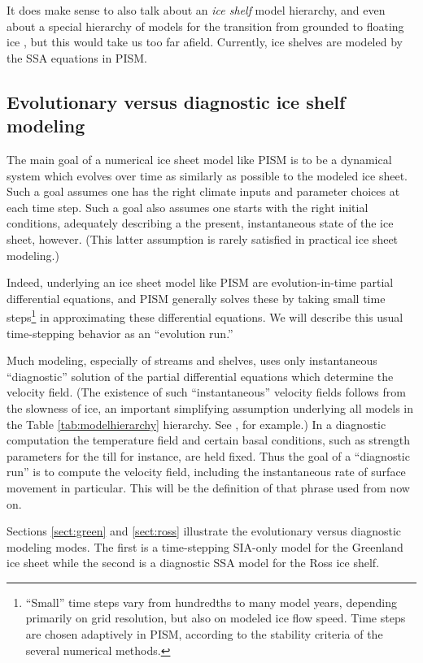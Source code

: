 \documentclass[11pt,final]{amsart}
\begin{document}
It does make sense to also talk about an \emph{ice shelf} model hierarchy, and even about a special hierarchy of models for the transition from grounded to floating ice \cite{SchoofMarine1}, but this would take us too far afield.  Currently, ice shelves are modeled by the SSA equations in PISM.


\subsection{Evolutionary versus diagnostic ice shelf modeling} \label{subsect:basicmodes}    The main goal of a numerical ice sheet model like PISM is to be a dynamical system which evolves over time as similarly as possible to the modeled ice sheet.  Such a goal assumes one has the right climate inputs and parameter choices at each time step.  Such a goal also assumes one starts with the right initial conditions, adequately describing a the present, instantaneous state of the ice sheet, however.  (This latter assumption is rarely satisfied in practical ice sheet modeling.)

Indeed, underlying an ice sheet model like PISM are evolution-in-time partial differential equations, and PISM generally solves these by taking small time steps\footnote{``Small'' time steps vary from hundredths to many model years, depending primarily on grid resolution, but also on modeled ice flow speed.  Time steps are chosen adaptively in PISM, according to the stability criteria of the several numerical methods.} in approximating these differential equations.  We will describe this usual time-stepping behavior as an ``evolution run.''

Much modeling, especially of streams and shelves, uses only instantaneous ``diagnostic'' solution of the partial differential equations which determine the velocity field.  (The existence of such ``instantaneous'' velocity fields follows from the slowness of ice, an important simplifying assumption underlying all models in the Table \ref{tab:modelhierarchy} hierarchy.  See \cite{Fowler}, for example.)  In a diagnostic computation the temperature field and certain basal conditions, such as strength parameters for the till for instance, are held fixed.  Thus the goal of a ``diagnostic run'' is to compute the velocity field, including the instantaneous rate of surface movement in particular.  This will be the definition of that phrase used from now on.

Sections \ref{sect:green} and \ref{sect:ross} illustrate the evolutionary versus diagnostic modeling modes.  The first is a time-stepping SIA-only model for the Greenland ice sheet while the second is a diagnostic SSA model for the Ross ice shelf.
\end{document}
